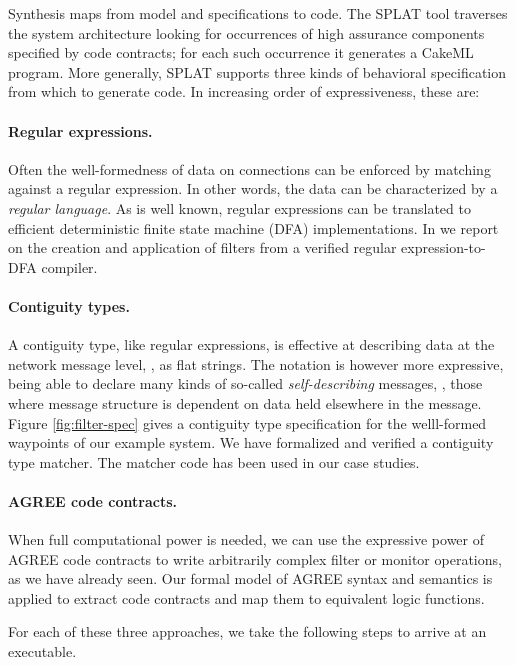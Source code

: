 Synthesis maps from model and specifications to code. The SPLAT tool
traverses the system architecture looking for occurrences of high
assurance components specified by code contracts; for each such
occurrence it generates a CakeML program. More generally, SPLAT supports
three kinds of behavioral specification from which to generate
code. In increasing order of expressiveness, these are:

\paragraph{Regular expressions.} Often the well-formedness of data on connections
can be enforced by matching against a regular expression. In other
words, the data can be characterized by a \emph{regular language}. As
is well known, regular expressions can be translated to efficient
deterministic finite state machine (DFA)
implementations. In \cite{formal-filter-synth-langsec,case-verified-filter}
we report on the creation and application of filters from a verified
regular expression-to-DFA compiler.

\paragraph{Contiguity types\cite{contiguity-types}.}
A contiguity type, like regular expressions, is effective at
describing data at the network message level, \eg, as flat
strings. The notation is however more expressive, being able to
declare many kinds of so-called \emph{self-describing} messages, \ie,
those where message structure is dependent on data held elsewhere in
the message. Figure \ref{fig:filter-spec} gives a contiguity type
specification for the welll-formed waypoints of our example system. We
have formalized and verified a contiguity type matcher. The matcher
code has been used in our case studies.

\paragraph{AGREE code contracts.} When full computational power is needed, we can use the
expressive power of AGREE code contracts to write arbitrarily complex
filter or monitor operations, as we have already seen. Our formal
model of AGREE syntax and semantics is applied to extract code
contracts and map them to equivalent logic functions.

\noindent For each of these three approaches, we take the following steps to
arrive at an executable.

